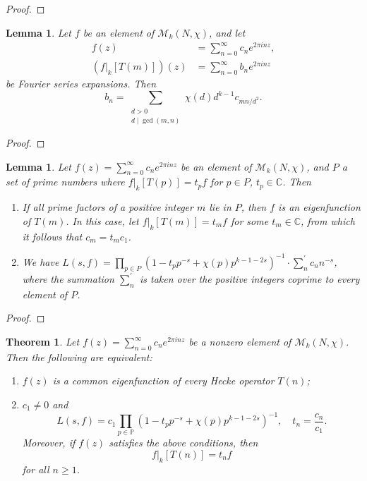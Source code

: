 \documentclass[10pt,leqno,twoside]{article}
\theoremstyle{plain}
\newtheorem{lemma}[lem]{Lemma}
\newtheorem{theorem}[lem]{Theorem}
\theoremstyle{definition}
\numberwithin{equation}{section}
\numberwithin{lem}{section}
\newcommand{\textib}[1]{\textbf{\textit{#1\index{#1}}}} %
\newcommand{\tbd}{{\Huge\color{red}{\textib{TBD}}}}
\begin{document}
\begin{proof}
    \tbd
\end{proof}
\begin{lemma}\label{lem: miyake lem 4.5.14}
    Let $f$ be an element of $\mathcal M_k(N,\chi)$, and let \begin{align*}
        f(z) &= \sum_{n=0}^\infty c_ne^{2\pi i n z},\\
        (f|_k[T(m)])(z) &= \sum_{n=0}^\infty b_ne^{2\pi i nz}
    \end{align*} be Fourier series expansions. Then \[b_n = \sum_{\substack{d>0 \\ d\mid \gcd(m,n)}}\chi(d)d^{k-1}c_{mn/d^2}.\]
\end{lemma}
\begin{proof}
    \tbd
\end{proof}
\begin{lemma}\label{lem: miyake lem 4.5.15}
    Let $f(z) = \sum_{n=0}^\infty c_ne^{2\pi i n z}$ be an element of $\mathcal M_k(N,\chi)$, and $P$ a set of prime numbers where $f|_k[T(p)] = t_pf$ for $p\in P$, $t_p\in\mathbb C$. Then 
    \begin{enumerate}[label=\textup{(\arabic*)}]
        \item If all prime factors of a positive integer $m$ lie in $P$, then $f$ is an eigenfunction of $T(m)$. In this case, let $f|_k[T(m)] = t_mf$ for some $t_m\in\mathbb C$, from which it follows that $c_m = t_mc_1$.
        \item We have $L(s,f) = \prod_{p\in P}(1-t_pp^{-s} + \chi(p)p^{k-1-2s})^{-1}\cdot \sum_n^\prime c_nn^{-s}$, where the summation $\sum_n^\prime$ is taken over the positive integers coprime to every element of $P$.
    \end{enumerate}
\end{lemma}
\begin{proof}
    \tbd
\end{proof}
\begin{theorem}\label{thm: miyake thm 4.5.16}
    Let $f(z) = \sum_{n=0}^\infty c_ne^{2\pi i nz}$ be a nonzero element of $\mathcal M_k(N,\chi)$. Then the following are equivalent: \begin{enumerate}[label=\textup{(\arabic*)}]
        \item $f(z)$ is a common eigenfunction of every Hecke operator $T(n)$;
        \item $c_1\neq 0$ and 
        \[L(s,f) = c_1\prod_{p\in\mathbb P} (1-t_pp^{-s} + \chi(p)p^{k-1-2s})^{-1},\quad t_n = \frac{c_n}{c_1}.\]
        Moreover, if $f(z)$ satisfies the above conditions, then
        \[f|_k[T(n)] = t_nf\] for all $n\geq 1$.
    \end{enumerate}
\end{theorem}
\end{document}
